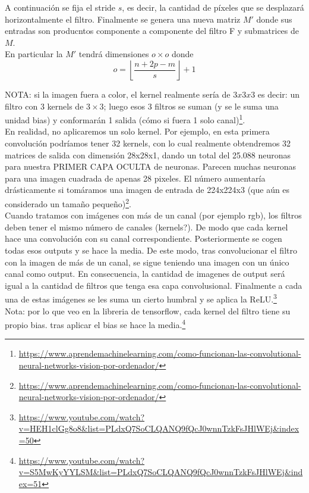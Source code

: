 \documentclass{article}
\begin{document}
A continuación se fija el stride $s$, es decir, la cantidad de píxeles que se desplazará horizontalmente el filtro. Finalmente se genera una nueva matriz $M'$ donde sus entradas son producntos componente a componente del filtro F y submatrices de $M$.\\

En particular la $M'$ tendrá dimensiones $o\times o$ donde
$$o=\left\lfloor \frac{n+2p-m}{s}\right\rfloor+1$$

NOTA: si la imagen fuera a color, el kernel realmente sería de $3x3x3$ es decir: un filtro con 3 kernels de $3\times3$; luego  esos 3 filtros se suman (y se le suma una unidad bias) y conformarán 1 salida (cómo si fuera 1 solo canal)\footnote{\url{https://www.aprendemachinelearning.com/como-funcionan-las-convolutional-neural-networks-vision-por-ordenador/}}.\\

En realidad, no aplicaremos un solo kernel. Por ejemplo, en esta primera convolución podríamos tener 32 kernels, con lo cual realmente obtendremos 32 matrices de salida con dimensión 28x28x1, dando un total del 25.088 neuronas para nuestra PRIMER CAPA OCULTA de neuronas. Parecen muchas neuronas para una imagen cuadrada de apenas 28 pixeles. El número aumentaría drásticamente si tomáramos una imagen de entrada de 224x224x3 (que aún es considerado un tamaño pequeño)\footnote{\url{https://www.aprendemachinelearning.com/como-funcionan-las-convolutional-neural-networks-vision-por-ordenador/}}.\\

Cuando tratamos con imágenes con más de un canal (por ejemplo rgb), los filtros deben tener el  mismo número de canales (kernels?). De modo que cada kernel  hace una convolución con su canal correspondiente. Posteriormente se cogen todas esos outputs y se hace la media. De este modo, tras convolucionar el filtro con la imagen de más de un canal, se sigue teniendo una imagen con un único canal como output. En consecuencia, la cantidad de imagenes de output será igual a la cantidad de filtros que tenga esa capa convolusional. Finalmente a cada una de estas imágenes se les suma un cierto humbral y se aplica la ReLU.\footnote{\url{https://www.youtube.com/watch?v=HEH1clGg8o8&list=PLdxQ7SoCLQANQ9fQcJ0wnnTzkFsJHlWEj&index=50}}\\

Nota: por lo que veo en la libreria de tensorflow, cada kernel del filtro tiene su propio bias. tras aplicar el bias se hace la media.\footnote{\url{https://www.youtube.com/watch?v=S5MwKyYYLSM&list=PLdxQ7SoCLQANQ9fQcJ0wnnTzkFsJHlWEj&index=51}}
\end{document}
